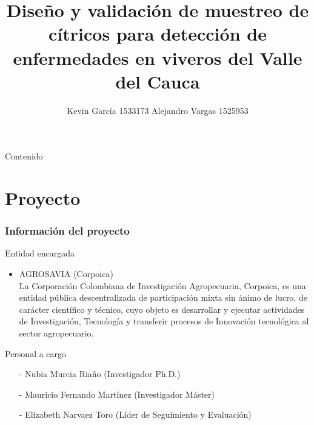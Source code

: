 \documentclass[10pt]{beamer}
\author[Kevin García - Alejandro Vargas]{Kevin García 1533173 \newline Alejandro Vargas 1525953}
\title[Anteproyecto]{Diseño y validación de muestreo de cítricos para detección de enfermedades en viveros del Valle del Cauca}
\begin{document}
\justify
\begin{frame}
\titlepage
\end{frame}

\begin{frame}{Contenido}
\tableofcontents
\end{frame}

\section{Proyecto}
\begin{frame}
\frametitle{Información del proyecto}
\begin{block}{Entidad encargada}
\begin{itemize}
\justifying
\item AGROSAVIA (Corpoica)
~\\La Corporación Colombiana de Investigación Agropecuaria, Corpoica, es una entidad pública descentralizada de participación mixta sin ánimo de lucro, de carácter científico y técnico, cuyo objeto es desarrollar y ejecutar actividades de Investigación, Tecnología y transferir procesos de Innovación tecnológica al sector agropecuario.
\end{itemize}
\end{block}

\begin{block}{Personal a cargo}
\begin{itemize}
\item[-]Nubia Murcia Riaño (Investigador Ph.D.)
\item[-]Mauricio Fernando Martínez (Investigador Máster)
\item[-]Elizabeth Narvaez Toro (Líder de Seguimiento y Evaluación)
\end{itemize}
\end{block}
\end{frame}
\end{document}
